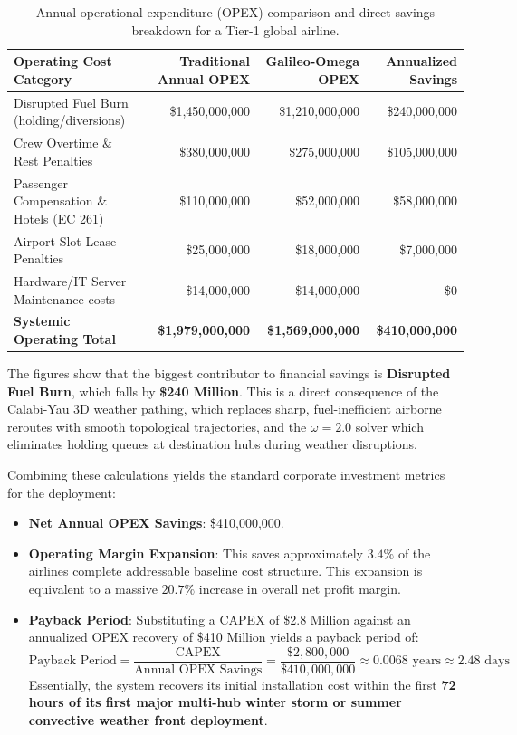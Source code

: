 \documentclass[11pt,a4paper]{book}
\begin{document}
\begin{table}[htbp]
\centering
\begin{tabular}{lrrr}
\hline
\textbf{Operating Cost Category} & \textbf{Traditional Annual OPEX} & \textbf{Galileo-Omega OPEX} & \textbf{Annualized Savings} \\
\hline
Disrupted Fuel Burn (holding/diversions) & \$1,450,000,000 & \$1,210,000,000 & \$240,000,000 \\
Crew Overtime \& Rest Penalties & \$380,000,000 & \$275,000,000 & \$105,000,000 \\
Passenger Compensation \& Hotels (EC 261) & \$110,000,000 & \$52,000,000 & \$58,000,000 \\
Airport Slot Lease Penalties & \$25,000,000 & \$18,000,000 & \$7,000,000 \\
Hardware/IT Server Maintenance costs & \$14,000,000 & \$14,000,000 & \$0 \\
\hline
\textbf{Systemic Operating Total} & \textbf{\$1,979,000,000} & \textbf{\$1,569,000,000} & \textbf{\$410,000,000} \\
\hline
\end{tabular}
\caption{Annual operational expenditure (OPEX) comparison and direct savings breakdown for a Tier-1 global airline.}
\label{tab:financial_opex_breakdown}
\end{table}

The figures show that the biggest contributor to financial savings is \textbf{Disrupted Fuel Burn}, which falls by \textbf{\$240 Million}. This is a direct consequence of the Calabi-Yau 3D weather pathing, which replaces sharp, fuel-inefficient airborne reroutes with smooth topological trajectories, and the $\omega = 2.0$ solver which eliminates holding queues at destination hubs during weather disruptions.

Combining these calculations yields the standard corporate investment metrics for the deployment:
\begin{itemize}
    \item \textbf{Net Annual OPEX Savings}: \$410,000,000.
    \item \textbf{Operating Margin Expansion}: This saves approximately $3.4\%$ of the airlines complete addressable baseline cost structure. This expansion is equivalent to a massive $20.7\%$ increase in overall net profit margin.
    \item \textbf{Payback Period}: Substituting a CAPEX of \$2.8 Million against an annualized OPEX recovery of \$410 Million yields a payback period of:
    \begin{equation}
    \label{eq:payback_calc}
    \text{Payback Period} = \frac{\text{CAPEX}}{\text{Annual OPEX Savings}} = \frac{\$2,800,000}{\$410,000,000} \approx 0.0068 \text{ years} \approx 2.48 \text{ days}
    \end{equation}
    Essentially, the system recovers its initial installation cost within the first \textbf{72 hours of its first major multi-hub winter storm or summer convective weather front deployment}.
\end{itemize}
\end{document}

